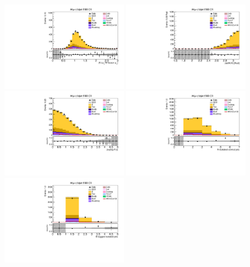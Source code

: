 \begin{figure}[tbp]
  \begin{center}
    \includegraphics[width=0.48\textwidth]{figures/wlnhbb2016/boosted/WmnWHTT2bFJCR_fj1WPtBalance.pdf}
    \includegraphics[width=0.48\textwidth]{figures/wlnhbb2016/boosted/WmnWHTT2bFJCR_deltaPhiVH.pdf}
    \includegraphics[width=0.48\textwidth]{figures/wlnhbb2016/boosted/WmnWHTT2bFJCR_dEtal1fj1.pdf}
    \includegraphics[width=0.48\textwidth]{figures/wlnhbb2016/boosted/WmnWHTT2bFJCR_nIsojet.pdf}
    \includegraphics[width=0.48\textwidth]{figures/wlnhbb2016/boosted/WmnWHTT2bFJCR_isojetNBtags.pdf}

\end{center}
\end{figure}
